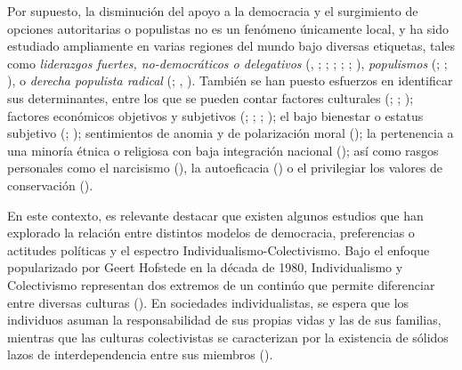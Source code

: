 \documentclass[
  letterpaper,
  DIV=11,
  numbers=noendperiod]{scrartcl}
\begin{document}
Por supuesto, la disminución del apoyo a la democracia y el surgimiento
de opciones autoritarias o populistas no es un fenómeno únicamente
local, y ha sido estudiado ampliamente en varias regiones del mundo bajo
diversas etiquetas, tales como \emph{liderazgos fuertes, no-democráticos
o delegativos} (,
; ; ;
;
;
), \emph{populismos}
(; ; ), o
\emph{derecha populista radical} (; ,
). También se han puesto esfuerzos en
identificar sus determinantes, entre los que se pueden contar factores
culturales (;
;
);
factores económicos objetivos y subjetivos
(;
;
; ); el bajo bienestar o estatus subjetivo
(;
); sentimientos de anomia
y de polarización moral (); la pertenencia a una minoría étnica o
religiosa con baja integración nacional
(); así como
rasgos personales como el narcisismo
(), la
autoeficacia () o
el privilegiar los valores de conservación ().

En este contexto, es relevante destacar que existen algunos estudios que
han explorado la relación entre distintos modelos de democracia,
preferencias o actitudes políticas y el espectro
Individualismo-Colectivismo. Bajo el enfoque popularizado por Geert
Hofstede en la década de 1980, Individualismo y Colectivismo representan
dos extremos de un continúo que permite diferenciar entre diversas
culturas (). En sociedades individualistas, se espera que los individuos
asuman la responsabilidad de sus propias vidas y las de sus familias,
mientras que las culturas colectivistas se caracterizan por la
existencia de sólidos lazos de interdependencia entre sus miembros
().
\end{document}

